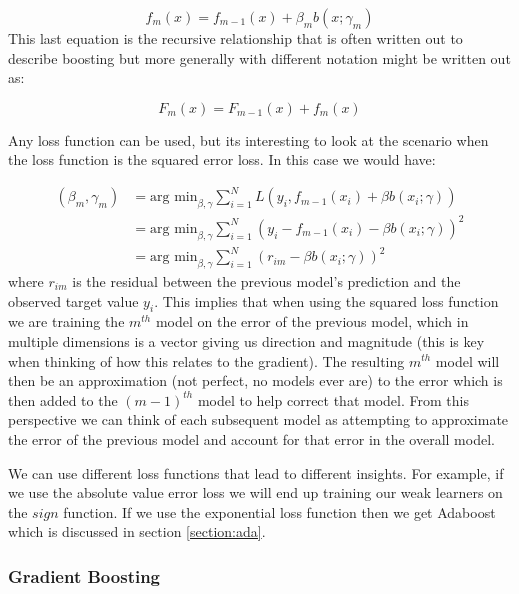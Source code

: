 \documentclass[paper=a4, fontsize=11pt]{scrartcl} %
\numberwithin{equation}{section} %
\numberwithin{figure}{section} %
\numberwithin{table}{section} %
\begin{document}
\begin{equation}
f_m(x) = f_{m-1}(x) + \beta_m b(x;\gamma_m)
\end{equation}
This last equation is the recursive relationship that is often written out to describe boosting but more generally with different notation might be written out as:

\begin{equation} \label{eq:recursive}
F_m(x) = F_{m-1}(x) + f_m(x)
\end{equation}

Any loss function can be used, but its interesting to look at the scenario when the loss function is the squared error loss. In this case we would have:

\begin{equation}
\begin{split}
(\beta_m, \gamma_m)  & = \text{arg min}_{\beta, \gamma} \sum_{i=1}^{N}{L(y_i, f_{m-1}(x_i) + \beta b(x_i;\gamma))}\\
&= \text{arg min}_{\beta, \gamma} \sum_{i=1}^{N}{(y_i - f_{m-1}(x_i) - \beta b(x_i;\gamma))^2}\\
&= \text{arg min}_{\beta, \gamma} \sum_{i=1}^{N}{(r_{im} - \beta b(x_i;\gamma))^2}
\end{split}
\end{equation}
where $r_{im}$ is the residual between the previous model's prediction and the observed target value $y_i$. This implies that when using the squared loss function we are training the $m^{th}$ model on the error of the previous model, which in multiple dimensions is a vector giving us direction and magnitude (this is key when thinking of how this relates to the gradient). The resulting $m^{th}$ model will then be an approximation (not perfect, no models ever are) to the error which is then added to the $(m-1)^{th}$ model to help correct that model. From this perspective we can think of each subsequent model as attempting to approximate the error of the previous model and account for that error in the overall model.

We can use different loss functions that lead to different insights. For example, if we use the absolute value error loss we will end up training our weak learners on the $sign$ function. If we use the exponential loss function then we get Adaboost which is discussed in section \ref{section:ada}.

\subsubsection{Gradient Boosting}
\end{document}
